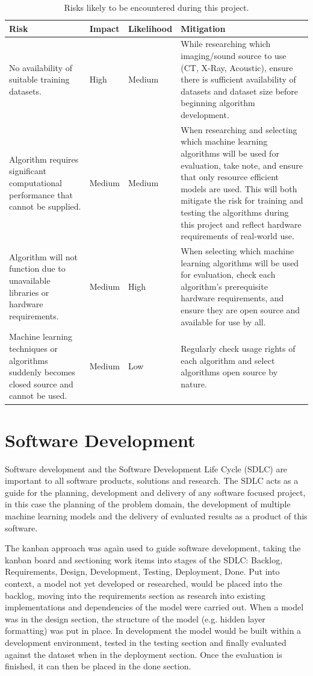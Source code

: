\begin{table}[H]
    \caption{Risks likely to be encountered during this project.}
    \centering
    \begin{tabular}{p{}|p{}|p{}|p{}}
    Risk & Impact & Likelihood & Mitigation\\
    \hline\hline
    No availability of suitable training datasets. & High & Medium & While researching which imaging/sound source to use (CT, X-Ray, Acoustic), ensure there is sufficient availability of datasets and dataset size before beginning algorithm development.\\
    Algorithm requires significant computational performance that cannot be supplied. & Medium & Medium & When researching and selecting which machine learning algorithms will be used for evaluation, take note, and ensure that only resource efficient models are used. This will both mitigate the risk for training and testing the algorithms during this project and reflect hardware requirements of real-world use.\\
    Algorithm will not function due to   unavailable libraries or hardware requirements. & Medium & High & When selecting which machine learning algorithms will be used for evaluation, check each algorithm’s prerequisite hardware requirements, and ensure they are open source and available for use by all.\\
    Machine learning techniques or algorithms suddenly becomes closed source and cannot be used. & Medium & Low & Regularly check usage rights of each algorithm and select algorithms open source by nature.\\ 
    \end{tabular}
    \label{tbl:risk-table}
\end{table}

\section{Software Development}
Software development and the Software Development Life Cycle (SDLC) are important to all software products, solutions and research. The SDLC acts as a guide for the planning, development and delivery of any software focused project, in this case the planning of the problem domain, the development of multiple machine learning models and the delivery of evaluated results as a product of this software.

The kanban approach was again used to guide software development, taking the kanban board and sectioning work items into stages of the SDLC: Backlog, Requirements, Design, Development, Testing, Deployment, Done. Put into context, a model not yet developed or researched, would be placed into the backlog, moving into the requirements section as research into existing implementations and dependencies of the model were carried out. When a model was in the design section, the structure of the model (e.g. hidden layer formatting) was put in place. In development the model would be built within a development environment, tested in the testing section and finally evaluated against the dataset when in the deployment section. Once the evaluation is finished, it can then be placed in the done section.

